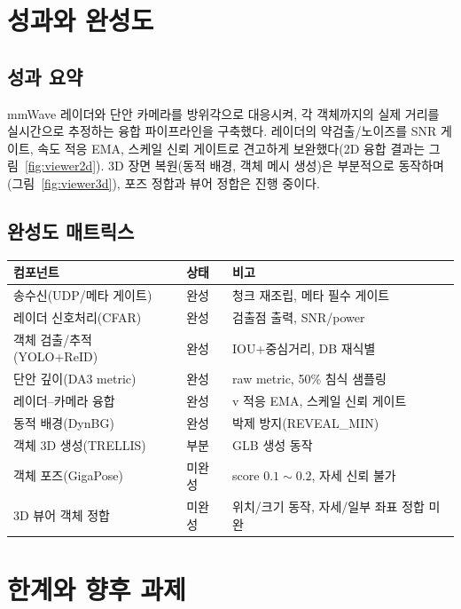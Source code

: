 \chapter{성과와 완성도}

\section{성과 요약}
mmWave 레이더와 단안 카메라를 방위각으로 대응시켜, 각 객체까지의 실제 거리를
실시간으로 추정하는 융합 파이프라인을 구축했다. 레이더의 약검출/노이즈를
SNR 게이트, 속도 적응 EMA, 스케일 신뢰 게이트로 견고하게 보완했다(2D 융합 결과는
그림~\ref{fig:viewer2d}). 3D 장면 복원(동적 배경, 객체 메시 생성)은 부분적으로
동작하며(그림~\ref{fig:viewer3d}), 포즈 정합과 뷰어 정합은 진행 중이다.

\section{완성도 매트릭스}
\begin{center}
\begin{tabular}{@{}lll@{}}
\toprule
컴포넌트 & 상태 & 비고 \\
\midrule
송수신(UDP/메타 게이트)        & 완성   & 청크 재조립, 메타 필수 게이트 \\
레이더 신호처리(CFAR)          & 완성   & 검출점 출력, SNR/power \\
객체 검출/추적(YOLO+ReID)      & 완성   & IOU+중심거리, DB 재식별 \\
단안 깊이(DA3 metric)          & 완성   & raw metric, 50\% 침식 샘플링 \\
레이더--카메라 융합            & 완성   & v 적응 EMA, 스케일 신뢰 게이트 \\
동적 배경(DynBG)               & 완성   & 박제 방지(REVEAL\_MIN) \\
객체 3D 생성(TRELLIS)          & 부분   & GLB 생성 동작 \\
객체 포즈(GigaPose)            & 미완성 & score $0.1\sim0.2$, 자세 신뢰 불가 \\
3D 뷰어 객체 정합              & 미완성 & 위치/크기 동작, 자세/일부 좌표 정합 미완 \\
\bottomrule
\end{tabular}
\end{center}

\chapter{한계와 향후 과제}

